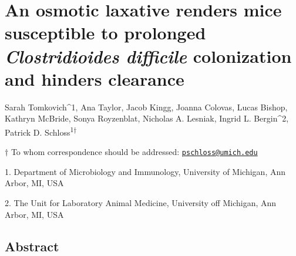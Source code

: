 \documentclass[
  11pt,
]{article}
\author{}
\date{\vspace{-2.5em}}
\begin{document}
\vspace{35mm}

\hypertarget{an-osmotic-laxative-renders-mice-susceptible-to-prolonged-clostridioides-difficile-colonization-and-hinders-clearance}{%
\section{\texorpdfstring{An osmotic laxative renders mice susceptible to
prolonged \emph{Clostridioides difficile} colonization and hinders
clearance}{An osmotic laxative renders mice susceptible to prolonged Clostridioides difficile colonization and hinders clearance}}\label{an-osmotic-laxative-renders-mice-susceptible-to-prolonged-clostridioides-difficile-colonization-and-hinders-clearance}}

\vspace{35mm}

Sarah Tomkovich\^{}1, Ana Taylor, Jacob Kingg, Joanna Colovas, Lucas
Bishop, Kathryn McBride, Sonya Royzenblat, Nicholas A. Lesniak, Ingrid
L. Bergin\^{}2, Patrick D. Schloss\textsuperscript{1\(\dagger\)}

\vspace{40mm}

\(\dagger\) To whom correspondence should be addressed:
\href{mailto:pschloss@umich.edu}{\nolinkurl{pschloss@umich.edu}}

1. Department of Microbiology and Immunology, University of Michigan,
Ann Arbor, MI, USA

2. The Unit for Laboratory Animal Medicine, University off Michigan, Ann
Arbor, MI, USA

\newpage
\linenumbers

\hypertarget{abstract}{%
\subsection{Abstract}\label{abstract}}
\end{document}
